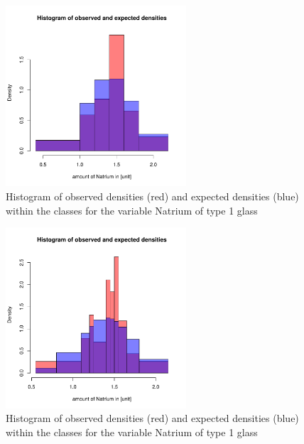 \documentclass[a4paper, 12pt, titlepage, headsepline, listof = totoc, bibliography = totoc, numbers = noenddot]{scrartcl}
\begin{document}
\begin{appendix}
\begin{figure}[h!]
\centering
\includegraphics[width=0.6\textwidth]{report-chisqType2Al}
\caption{Histogram of observed densities (red) and expected densities (blue) within the classes for the variable Natrium of type 1 glass}
\label{fig:1}
\end{figure}

\begin{figure}[h!]
\centering
\includegraphics[width=0.6\textwidth]{report-chisqType2Al-30}
\caption{Histogram of observed densities (red) and expected densities (blue) within the classes for the variable Natrium of type 1 glass}
\label{fig:2}
\end{figure}

\end{appendix}


\newpage
\listoffigures
\listoftables




\end{document}
